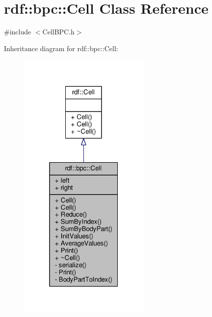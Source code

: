 \hypertarget{classrdf_1_1bpc_1_1Cell}{}\section{rdf\+:\+:bpc\+:\+:Cell Class Reference}
\label{classrdf_1_1bpc_1_1Cell}


{\ttfamily \#include $<$Cell\+B\+P\+C.\+h$>$}



Inheritance diagram for rdf\+:\+:bpc\+:\+:Cell\+:
\nopagebreak
\begin{figure}[H]
\begin{center}
\leavevmode
\includegraphics[width=184pt]{classrdf_1_1bpc_1_1Cell__inherit__graph}
\end{center}
\end{figure}


